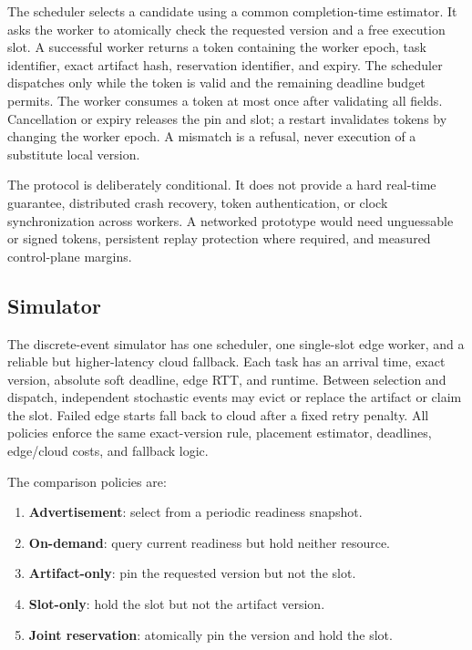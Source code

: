 \documentclass[conference]{IEEEtran}
\begin{document}
The scheduler selects a candidate using a common completion-time estimator. It asks the worker to atomically check the requested version and a free execution slot. A successful worker returns a token containing the worker epoch, task identifier, exact artifact hash, reservation identifier, and expiry. The scheduler dispatches only while the token is valid and the remaining deadline budget permits. The worker consumes a token at most once after validating all fields. Cancellation or expiry releases the pin and slot; a restart invalidates tokens by changing the worker epoch. A mismatch is a refusal, never execution of a substitute local version.

The protocol is deliberately conditional. It does not provide a hard real-time guarantee, distributed crash recovery, token authentication, or clock synchronization across workers. A networked prototype would need unguessable or signed tokens, persistent replay protection where required, and measured control-plane margins.

\subsection{Simulator}

The discrete-event simulator has one scheduler, one single-slot edge worker, and a reliable but higher-latency cloud fallback. Each task has an arrival time, exact version, absolute soft deadline, edge RTT, and runtime. Between selection and dispatch, independent stochastic events may evict or replace the artifact or claim the slot. Failed edge starts fall back to cloud after a fixed retry penalty. All policies enforce the same exact-version rule, placement estimator, deadlines, edge/cloud costs, and fallback logic.

The comparison policies are:
\begin{enumerate}
\item \textbf{Advertisement}: select from a periodic readiness snapshot.
\item \textbf{On-demand}: query current readiness but hold neither resource.
\item \textbf{Artifact-only}: pin the requested version but not the slot.
\item \textbf{Slot-only}: hold the slot but not the artifact version.
\item \textbf{Joint reservation}: atomically pin the version and hold the slot.
\end{enumerate}
\end{document}
